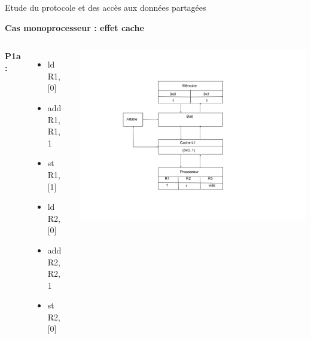 \documentclass{beamer}
\begin{document}
\begin{frame}{Etude du protocole et des accès aux données partagées}
    \addtocounter{framenumber}{-1}
    \textbf{Cas monoprocesseur : effet cache}
    \begin{columns}[c] %

        \textbf{P1a : }
        \begin{itemize}
            \item ld R1, [0]
            \item add R1, R1, 1
            \item  st R1, [1]
            \item  ld R2, [0]
            \item add R2, R2, 1
            \item st R2, [0]
        \end{itemize}

        \includegraphics[scale=0.28]{f6.png}
        
    \end{columns}
\end{frame}

\end{document}
